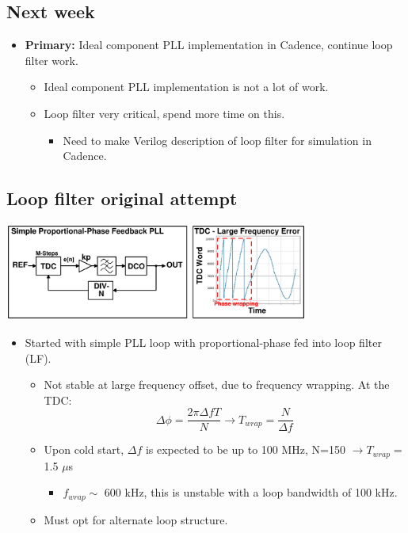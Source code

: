 \documentclass[10pt,a4paper]{article}
\begin{document}
		\subsection{Next week} 
		\begin{itemize}
			\footnotesize
			\item \textbf{Primary:} Ideal component PLL implementation in Cadence, \color{red} continue loop filter work.
			\begin{itemize}
				\footnotesize
				\item Ideal component PLL implementation is not a lot of work.
				\item Loop filter very critical, spend more time on this.
				\begin{itemize}
					\footnotesize
					\item Need to make Verilog description of loop filter for simulation in Cadence.
				\end{itemize}
			\end{itemize} 
		\end{itemize}   
		\flushleft
		\subsection{Loop filter original attempt}
		\vspace{-.2em}
		\vspace{-0.5em}
		\center\includegraphics[width=0.75\textwidth, angle=0]{figs/phase_wrap.pdf}
		\vspace{-0.5em}
		\begin{itemize}
			\footnotesize
			\item Started with simple PLL loop with proportional-phase fed into loop filter (LF).
			\begin{itemize}
				\scriptsize
				\item Not stable at large frequency offset, due to frequency wrapping. At the TDC:
				\tiny
				\begin{equation}
					\Delta \phi = \frac{2\pi \Delta f T}{N} \rightarrow T_{wrap} = \frac{N}{\Delta f}
				\end{equation}
				\scriptsize
				\item Upon cold start, $\Delta f$ is expected to be up to 100 MHz, N=150 $\rightarrow T_{wrap} = $ 1.5 $\mu$s
				\begin{itemize} 
					\scriptsize
					\item $f_{wrap} \sim$  600 kHz, this is unstable with a loop bandwidth of 100 kHz.
				\end{itemize}
				\item Must opt for alternate loop structure.
			\end{itemize}
		\end{itemize} 	
		\flushleft
\end{document}
